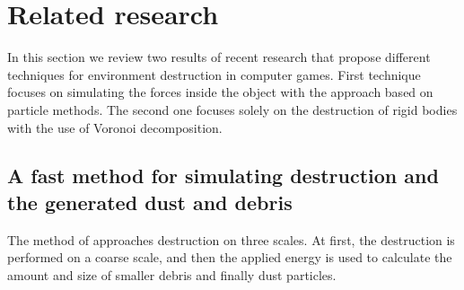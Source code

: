 
\section{Related research}
In this section we review two results of recent research that propose different techniques for environment destruction in computer games. First technique focuses on simulating the forces inside the object with the approach based on particle methods. The second one focuses solely on the destruction of rigid bodies with the use of Voronoi decomposition.

\subsection{A fast method for simulating destruction and the generated dust
and debris}
\label{sec:edem}
The method of \citet{edem} approaches destruction on three scales. At first, the destruction is performed on a coarse scale, and then the applied energy is used to calculate the amount and size of smaller debris and finally dust particles.

